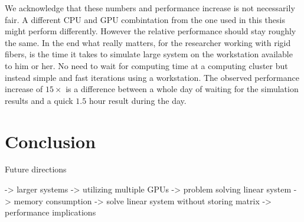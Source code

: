 \documentclass[a4paper,11pt]{kth-mag}
\begin{document}
We acknowledge that these numbers and performance increase is not necessarily fair. A different CPU and GPU combintation from the one used in this thesis might perform differently. However the relative performance should stay roughly the same. In the end what really matters, for the researcher working with rigid fibers, is the time it takes to simulate large system on the workstation available to him or her. No need to wait for computing time at a computing cluster but instead simple and fast iterations using a workstation. The observed performance increase of $15\times$ is a difference between a whole day of waiting for the simulation results and a quick $1.5$ hour result during the day. 

\chapter{Conclusion}

Future directions

-> larger systems -> utilizing multiple GPUs -> problem solving linear system
-> memory consumption -> solve linear system without storing matrix -> performance implications

\appendix
\addappheadtotoc
\end{document}
